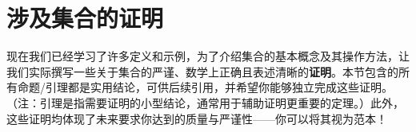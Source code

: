 \section{涉及集合的证明}\label{sec:section3.9}

现在我们已经学习了许多定义和示例，为了介绍集合的基本概念及其操作方法，让我们实际撰写一些关于集合的严谨、数学上正确且表述清晰的\textbf{证明}。本节包含的所有命题/引理都是实用结论，可供后续引用，并希望你能够独立完成这些证明。（注：引理是指需要证明的小型结论，通常用于辅助证明更重要的定理。）此外，这些证明均体现了未来要求你达到的质量与严谨性——你可以将其视为范本！









